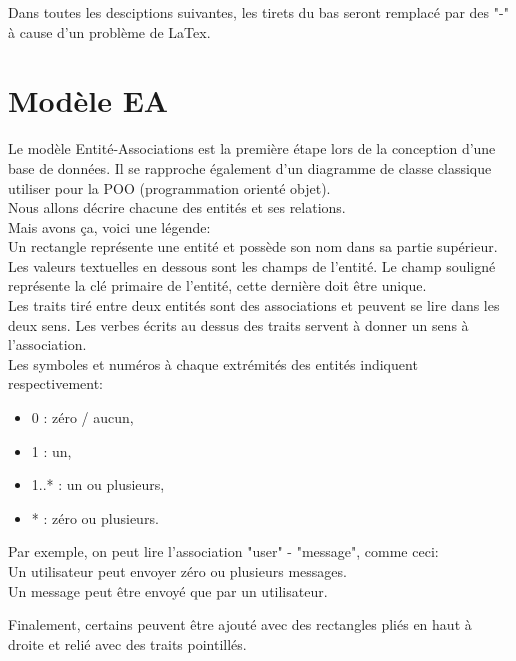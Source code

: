 \documentclass[
    iai, %
    il, %
]{heig-tb}
\begin{document}
Dans toutes les desciptions suivantes, les tirets du bas seront remplacé par des "-" à cause d'un problème de LaTex.

\section{Modèle EA}
Le modèle Entité-Associations est la première étape lors de la conception d'une base de données. Il se rapproche également d'un diagramme de classe classique utiliser pour la POO (programmation orienté objet).\\
Nous allons décrire chacune des entités et ses relations.\\
Mais avons ça, voici une légende:\\
Un rectangle représente une entité et possède son nom dans sa partie supérieur.\\
Les valeurs textuelles en dessous sont les champs de l'entité. Le champ souligné représente la clé primaire de l'entité, cette dernière doit être unique.\\
Les traits tiré entre deux entités sont des associations et peuvent se lire dans les deux sens. Les verbes écrits au dessus des traits servent à donner un sens à l'association.\\
Les symboles et numéros à chaque extrémités des entités indiquent respectivement:
\begin{itemize}
    \item 0 : zéro / aucun,
    \item 1 : un,
    \item 1..* : un ou plusieurs,
    \item * : zéro ou plusieurs.
\end{itemize}

Par exemple, on peut lire l'association "user" - "message", comme ceci:\\
Un utilisateur peut envoyer zéro ou plusieurs messages.\\
Un message peut être envoyé que par un utilisateur.

Finalement, certains peuvent être ajouté avec des rectangles pliés en haut à droite et relié avec des traits pointillés.
\end{document}
